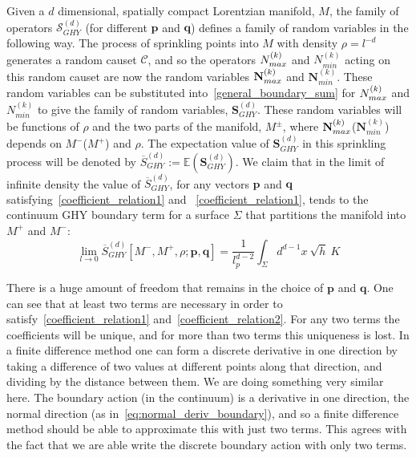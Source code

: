 \documentclass[12pt]{article}
\newcommand{\be}{\begin{equation}}
\newcommand{\ee}{\end{equation}}
\begin{document}
Given a $d$ dimensional, spatially compact Lorentzian manifold, $M$, the family of operators $\mathcal{S}^{(d)}_{GHY}$ (for different $\mathbf{p}$ and $\mathbf{q}$) defines a family of random variables in the following way. The process of sprinkling points into $M$ with density $\rho=l^{-d}$ generates a random causet $\mathcal{C}$, and so the operators $N_{\vphantom{i}max}^{(k)}$ and $N_{min}^{(k)}$ acting on this random causet are now the random variables $\textbf{N}_{\vphantom{i}max}^{(k)}$ and $\textbf{N}_{min}^{(k)}$. These random variables can be substituted into~\eqref{general_boundary_sum} for $N_{\vphantom{i}max}^{(k)}$ and $N_{min}^{(k)}$ to give the family of random variables, $\textbf{S}^{(d)}_{GHY}$. These random variables will be functions of $\rho$ and the two parts of the manifold, $M^{\pm}$, where  $\textbf{N}_{\vphantom{i}max}^{(k)}$($\textbf{N}_{min}^{(k)}$) depends on $M^-$($M^+$) and $\rho$. The expectation value of $\textbf{S}^{(d)}_{GHY}$ in this sprinkling process will be denoted by $\overline{S}^{(d)}_{GHY}:=\mathbb{E}(\textbf{S}^{(d)}_{GHY})$. We claim that in the limit of infinite density the value of $\overline{S}^{(d)}_{GHY}$, for any vectors $\mathbf{p}$ and $\mathbf{q}$ satisfying~\eqref{coefficient_relation1} and ~\eqref{coefficient_relation1}, tends to the continuum GHY boundary term for a surface $\Sigma$ that partitions the manifold into $M^+$ and $M^-$:
\be
\lim_{l\rightarrow0}\overline{S}^{(d)}_{GHY}[M^-,M^+,\rho;\mathbf{p} , \mathbf{q}]= \frac{1}{l_p^{d-2}}\int_{\Sigma} d^{d-1}x\: \sqrt{h}\: K\label{eq:mainconjecture}
\ee

There is a huge amount of freedom that remains in the choice of $\mathbf{p}$ and $\mathbf{q}$. One can see that at least two terms are necessary in order to satisfy~\eqref{coefficient_relation1} and~\eqref{coefficient_relation2}. For any two terms the coefficients will be unique, and for more than two terms this uniqueness is lost. In a finite difference method one can form a discrete derivative in one direction by taking a difference of two values at different points along that direction, and dividing by the distance between them. We are doing something very similar here. The boundary action (in the continuum) is a derivative in one direction, the normal direction (as in~\eqref{eq:normal_deriv_boundary}), and so a finite difference method should be able to approximate this with just two terms. This agrees with the fact that we are able write the discrete boundary action with only two terms.
\end{document}
